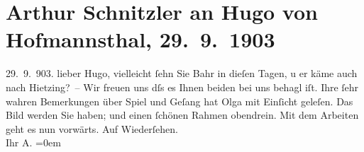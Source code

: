 

         
         \newcommand{\erwaehntePersonen}{Personen: Hermann Bahr, Hugo von Hofmannsthal, Olga Schnitzler}
         \newcommand{\erwaehnteInstitutionen}{}
         \newcommand{\erwaehnteOrte}{Orte: Wien, XIII., Hietzing}
         \newcommand{\erwaehnteWerke}{Werke: Arthur Schnitzler (1903)}
               \section[Arthur Schnitzler an Hugo von Hofmannsthal, 29. 9. 1903]{ Arthur Schnitzler an Hugo von Hofmannsthal,
                    29. 9. 1903}\nopagebreak{}\rehead{ }\begin{ledgroupsized}[t]{13cm}\normalsize\beginnumbering \toendnotes[C]{\smallbreak\pagebreak[2]} 
\toendnotes[C]{\smallbreak}\pstart
           \raggedleft{}{\pb}29. 9. 903.\pend
           \pstart
           lieber Hugo, vielleicht ſehn Sie Bahr in dieſen Tagen, u er käme \label{K_L01320_1v}\label{K_L01320_1h} auch nach Hietzing? –\pend
           \pstart
           Wir freuen uns dſs es Ihnen beiden bei uns behagl iſt. Ihre ſehr wahren
                    Bemerkungen über Spiel und Geſang hat Olga
                    mit Einſicht geleſen.\pend
           \pstart
           Das Bild werden Sie haben;
                    und einen ſchönen Rahmen obendrein.\pend
           \pstart
           Mit dem Arbeiten geht es nun vorwärts.\pend
           \pstart
           Auf Wiederſehen.{\\[\baselineskip]}Ihr \spacefill\mbox{A.}\pend
           \leftskip=0em{}
         
         \endnumbering{}\end{ledgroupsized}  \newcommand{\dateiname}{L01320}\newcommand{\titel}{Arthur Schnitzler an Hugo von Hofmannsthal, 29. 9. 1903}\newcommand{\editorInnen}{ Martin Anton Müller und Gerd-Hermann Susen}
      